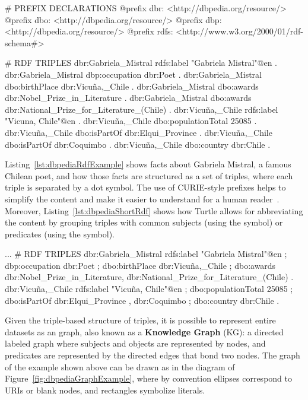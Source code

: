 \begin{sparqlcode}[caption={Set of \RDF{} triples about Gabriela Mistral in DBpedia using Turtle syntax.},label={lst:dbpediaRdfExample}]
# PREFIX DECLARATIONS
@prefix dbr: <http://dbpedia.org/resource/>
@prefix dbo: <http://dbpedia.org/resource/>
@prefix dbp: <http://dbpedia.org/resource/>
@prefix rdfs: <http://www.w3.org/2000/01/rdf-schema#>

# RDF TRIPLES
dbr:Gabriela_Mistral rdfs:label "Gabriela Mistral"@en .
dbr:Gabriela_Mistral dbp:occupation dbr:Poet .
dbr:Gabriela_Mistral dbo:birthPlace dbr:Vicuña,_Chile .
dbr:Gabriela_Mistral dbo:awards dbr:Nobel_Prize_in_Literature .
dbr:Gabriela_Mistral dbo:awards dbr:National_Prize_for_Literature_(Chile) .
dbr:Vicuña,_Chile rdfs:label "Vicuna, Chile"@en .
dbr:Vicuña,_Chile dbo:populationTotal 25085 .
dbr:Vicuña,_Chile dbo:isPartOf dbr:Elqui_Province .
dbr:Vicuña,_Chile dbo:isPartOf dbr:Coquimbo .
dbr:Vicuña,_Chile dbo:country dbr:Chile .
\end{sparqlcode}

Listing~\ref{lst:dbpediaRdfExample} shows facts about Gabriela Mistral, a famous Chilean poet, 
and how those facts are structured as a set of \RDF{} triples, where each triple is separated by a 
dot symbol. The use of CURIE-style prefixes helps to simplify the content and make it easier to 
understand for a human reader~\cite{key:prefixes}. Moreover, Listing~\ref{lst:dbpediaShortRdf} 
shows how Turtle allows for abbreviating the content by grouping triples with common subjects 
(using the \squotestt{;} symbol) or predicates (using the \squotestt{,} symbol).

\begin{sparqlcode}[label={lst:dbpediaShortRdf},caption={Set of \RDF{} abbreviated triples about Gabriela Mistral in DBpedia.}]
...
# RDF TRIPLES
dbr:Gabriela_Mistral rdfs:label "Gabriela Mistral"@en ;
    dbp:occupation dbr:Poet ;
    dbo:birthPlace dbr:Vicuña,_Chile ;
    dbo:awards dbr:Nobel_Prize_in_Literature, dbr:National_Prize_for_Literature_(Chile) .
dbr:Vicuña,_Chile rdfs:label "Vicuña, Chile"@en ;
    dbo:populationTotal 25085 ;
    dbo:isPartOf dbr:Elqui_Province , dbr:Coquimbo ;
    dbo:country dbr:Chile .
\end{sparqlcode}

Given the triple-based structure of \RDF{} triples, it is possible to represent entire 
datasets as an \RDF{} graph, also known as a \textbf{Knowledge Graph} (KG): a directed labeled 
graph where subjects and objects are represented by nodes, and predicates are represented 
by the directed edges that bond two nodes. The \RDF{} graph of the example shown above can be 
drawn as in the diagram of Figure~\ref{fig:dbpediaGraphExample}, where by convention 
ellipses correspond to URIs or blank nodes, and rectangles symbolize literals.

